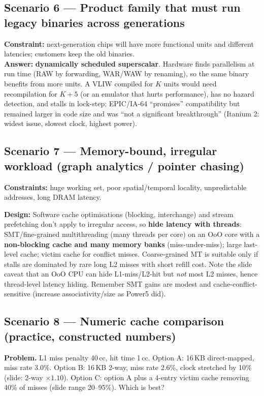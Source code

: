\subsection*{Scenario 6 --- Product family that must run legacy binaries across generations}
\textbf{Constraint:} next-generation chips will have more functional units and different latencies; customers keep the old binaries.\\
\textbf{Answer:} \textbf{dynamically scheduled superscalar}. Hardware finds parallelism at run time (RAW by forwarding, WAR/WAW by renaming), so the same binary benefits from more units. A VLIW compiled for $K$ units would need recompilation for $K{+}5$ (or an emulator that hurts performance), has no hazard detection, and stalls in lock-step; EPIC/IA-64 ``promises'' compatibility but remained larger in code size and was ``not a significant breakthrough'' (Itanium 2: widest issue, slowest clock, highest power).

\subsection*{Scenario 7 --- Memory-bound, irregular workload (graph analytics / pointer chasing)}
\textbf{Constraints:} huge working set, poor spatial/temporal locality, unpredictable addresses, long DRAM latency.

\textbf{Design:} Software cache optimisations (blocking, interchange) and stream prefetching don't apply to irregular access, so \textbf{hide latency with threads}: SMT/fine-grained multithreading (many threads per core) on an OoO core with a \textbf{non-blocking cache and many memory banks} (miss-under-miss); large last-level cache; victim cache for conflict misses. Coarse-grained MT is suitable only if stalls are dominated by rare long L2 misses with short refill cost. Note the slide caveat that an OoO CPU can hide L1-miss/L2-hit but \emph{not} most L2 misses, hence thread-level latency hiding. Remember SMT gains are modest and cache-conflict-sensitive (increase associativity/size as Power5 did).

\subsection*{Scenario 8 --- Numeric cache comparison (practice, constructed numbers)}
\textbf{Problem.} L1 miss penalty 40\,cc, hit time 1\,cc. Option A: 16\,KB direct-mapped, miss rate 3.0\%. Option B: 16\,KB 2-way, miss rate 2.6\%, clock stretched by 10\% (slide: 2-way $\times1.10$). Option C: option A plus a 4-entry victim cache removing 40\% of misses (slide range 20--95\%). Which is best?

